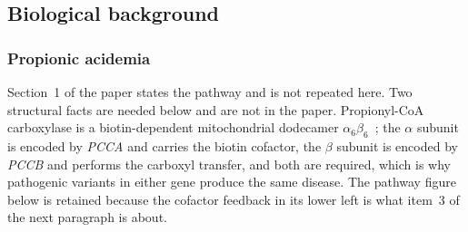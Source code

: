 \subsection{Biological background}

\subsubsection{Propionic acidemia}
\label{sec:pa}

Section~1 of the paper states the pathway and is not repeated here. Two structural facts
are needed below and are not in the paper. Propionyl-CoA carboxylase is a biotin-dependent
mitochondrial dodecamer $\alpha_6\beta_6$~\cite{pcc_structure}; %
the $\alpha$ subunit is encoded by \emph{PCCA} and carries the biotin cofactor, the
$\beta$ subunit is encoded by \emph{PCCB} and performs the carboxyl transfer, and both are
required, which is why pathogenic variants in either gene produce the same disease. The
pathway figure below is retained because the cofactor feedback in its lower left is what
item~3 of the next paragraph is about.


